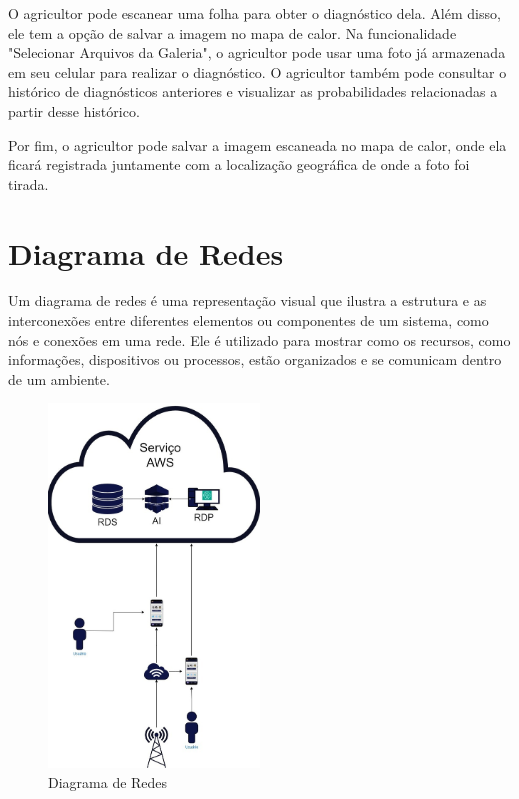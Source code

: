 \documentclass[
  a4paper,%
  12pt,%
  english,%
  brazilian,%
]{article}
\begin{document}
\newpage

O agricultor pode escanear uma folha para obter o diagnóstico dela. Além disso, ele tem a opção de salvar a imagem no mapa de calor. Na funcionalidade "Selecionar Arquivos da Galeria", o agricultor pode usar uma foto já armazenada em seu celular para realizar o diagnóstico. O agricultor também pode consultar o histórico de diagnósticos anteriores e visualizar as probabilidades relacionadas a partir desse histórico.
    
Por fim, o agricultor pode salvar a imagem escaneada no mapa de calor, onde ela ficará registrada juntamente com a localização geográfica de onde a foto foi tirada.

\section*{Diagrama de Redes}

    Um diagrama de redes é uma representação visual que ilustra a estrutura e as interconexões entre diferentes elementos ou componentes de um sistema, como nós e conexões em uma rede. Ele é utilizado para mostrar como os recursos, como informações, dispositivos ou processos, estão organizados e se comunicam dentro de um ambiente.
  
    \begin{figure}[h]
        \centering
        \caption{Diagrama de Redes}%
        \label{fig:diagrama-redes}
         \includegraphics[width=0.5\textwidth]{Logos/Diagrama_redes.jpg}
        \end{figure}
\end{document}
